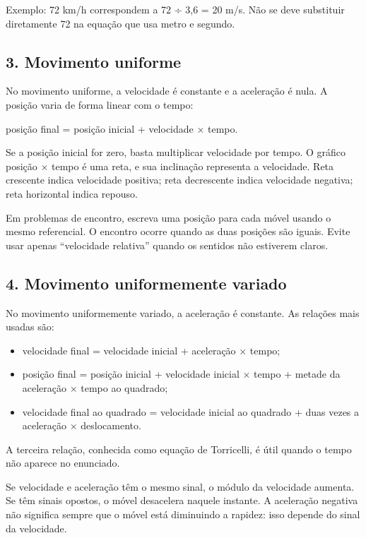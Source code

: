 \documentclass[11pt,a4paper]{article}
\begin{document}
Exemplo: 72 km/h correspondem a 72 ÷ 3,6 = 20 m/s. Não se deve substituir diretamente 72 na equação que usa metro e segundo.

\subsection*{3. Movimento uniforme}

No movimento uniforme, a velocidade é constante e a aceleração é nula. A posição varia de forma linear com o tempo:

posição final = posição inicial + velocidade × tempo.

Se a posição inicial for zero, basta multiplicar velocidade por tempo. O gráfico posição × tempo é uma reta, e sua inclinação representa a velocidade. Reta crescente indica velocidade positiva; reta decrescente indica velocidade negativa; reta horizontal indica repouso.

Em problemas de encontro, escreva uma posição para cada móvel usando o mesmo referencial. O encontro ocorre quando as duas posições são iguais. Evite usar apenas “velocidade relativa” quando os sentidos não estiverem claros.

\subsection*{4. Movimento uniformemente variado}

No movimento uniformemente variado, a aceleração é constante. As relações mais usadas são:

\begin{itemize}
  \item velocidade final = velocidade inicial + aceleração × tempo;
  \item posição final = posição inicial + velocidade inicial × tempo + metade da aceleração × tempo ao quadrado;
  \item velocidade final ao quadrado = velocidade inicial ao quadrado + duas vezes a aceleração × deslocamento.
\end{itemize}

A terceira relação, conhecida como equação de Torricelli, é útil quando o tempo não aparece no enunciado.

Se velocidade e aceleração têm o mesmo sinal, o módulo da velocidade aumenta. Se têm sinais opostos, o móvel desacelera naquele instante. A aceleração negativa não significa sempre que o móvel está diminuindo a rapidez: isso depende do sinal da velocidade.
\end{document}
